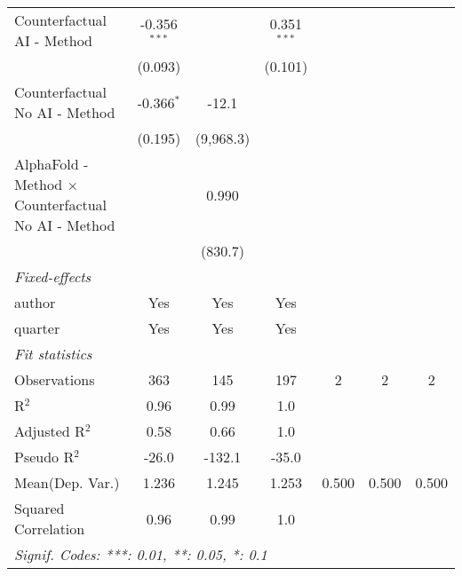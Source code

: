 \begin{tabular}{lcccccc}
   Counterfactual AI - Method                                 & -0.356$^{***}$ &              & 0.351$^{***}$  &     &     &   \\   
                                                              & (0.093)        &              & (0.101)        &     &     &   \\   
   Counterfactual No AI - Method                              & -0.366$^{*}$   & -12.1        &                &     &     &   \\   
                                                              & (0.195)        & (9,968.3)    &                &     &     &   \\   
   AlphaFold - Method $\times$ Counterfactual No AI - Method  &                & 0.990        &                &     &     &   \\   
                                                              &                & (830.7)      &                &     &     &   \\   
   \midrule
   \emph{Fixed-effects}\\
   author                                                     & Yes            & Yes          & Yes            &     &     & \\  
   quarter                                                    & Yes            & Yes          & Yes            &     &     & \\  
   \midrule
   \emph{Fit statistics}\\
   Observations                                               & 363            & 145          & 197            & 2   & 2   & 2\\  
   R$^2$                                                      & 0.96           & 0.99         & 1.0            &     &     & \\  
   Adjusted R$^2$                                             & 0.58           & 0.66         & 1.0            &     &     & \\  
   Pseudo R$^2$                                               & -26.0          & -132.1       & -35.0          &     &     & \\  
Mean(Dep. Var.) & 1.236 & 1.245 & 1.253 & 0.500 & 0.500 & 0.500 \\
   Squared Correlation                                        & 0.96           & 0.99         & 1.0            &     &     & \\  
   \midrule \midrule
   \multicolumn{7}{l}{\emph{Signif. Codes: ***: 0.01, **: 0.05, *: 0.1}}\\
\end{tabular}
\par\endgroup
